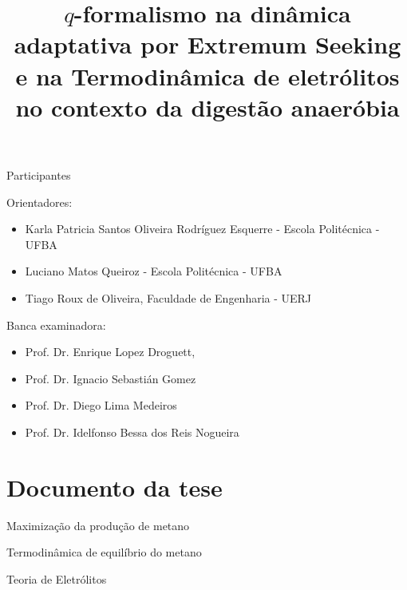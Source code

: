\documentclass{beamer}
\title{$q$-formalismo na dinâmica adaptativa por Extremum Seeking e na Termodinâmica de eletrólitos no contexto da digestão anaeróbia}
\begin{document}
\begin{frame}
\titlepage
\end{frame}


\begin{frame}{Participantes}
	\begin{block}{Orientadores:}	 
	\begin{itemize}
    \item     Karla Patricia Santos Oliveira Rodríguez Esquerre  - Escola Politécnica - UFBA
    \item      Luciano Matos Queiroz - Escola Politécnica - UFBA
    \item      Tiago Roux de Oliveira, Faculdade de Engenharia - UERJ
    \end{itemize}
	\end{block}
	
	\begin{block}{Banca examinadora:}
	\begin{itemize}
  \item Prof. Dr. Enrique Lopez Droguett,  
	\item Prof. Dr. Ignacio Sebastián Gomez
	\item Prof. Dr. Diego Lima Medeiros
	\item Prof. Dr. Idelfonso Bessa dos Reis Nogueira
	\end{itemize}
	
	\end{block}

\end{frame}

\section{Documento da tese}

\begin{frame}
\begin{block}{Maximização da produção de metano}

\end{block}
\begin{block}{Termodinâmica de equilíbrio do metano}

\end{block}
\begin{block}{Teoria de Eletrólitos}

\end{block}

\end{frame}
\end{document}
